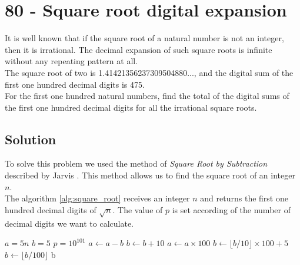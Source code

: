 \chapter*{80 - Square root digital expansion}

It is well known that if the square root of a natural number is not an integer, then it is irrational. The decimal expansion of such square roots is infinite without any repeating pattern at all.\\

The square root of two is 1.41421356237309504880..., and the digital sum of the first one hundred decimal digits is 475.\\

For the first one hundred natural numbers, find the total of the digital sums of the first one hundred decimal digits for all the irrational square roots.\\

\section*{Solution}

To solve this problem we used the method of \textit{Square Root by Subtraction} described by Jarvis \cite{square_root}. This method allows us to find the square root of an integer $n$.\\

The algorithm \ref{alg:square_root} receives an integer $n$ and returns the first one hundred decimal digits of $\sqrt{n}$. The value of $p$ is set according of the number of decimal digits we want to calculate. 

\begin{algorithm}[H]
\caption{$squareRoot(n)$}
\begin{algorithmic}
    \STATE $a = 5n$
    \STATE $b=5$
    \STATE $p=10^{101}$
            \STATE $a \gets a-b$
            \STATE $b \gets b + 10$
        \ELSE
            \STATE $a \gets a \times 100$
            \STATE $b \gets \lfloor b/10 \rfloor \times 100 + 5$
        \ENDIF
    \ENDWHILE
    \STATE $b \gets \lfloor b/100 \rfloor$
    \RETURN b
\end{algorithmic}
\label{alg:square_root}
\end{algorithm}
